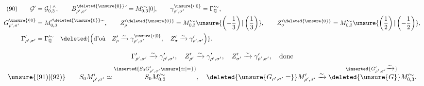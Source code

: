 \[
\begin{aligned}
 (90)\qquad
 \mathcal G'&=\mathcal G_{0,3}^{+\wedge},\qquad
 B_{\rho',\sigma'}^{\deleted{\unsure{0}}\,\prime}
 =M_{0,3}^{\prime\sim}[0],\qquad
 \gamma_{\rho',\sigma'}^{\unsure{\prime|0}}
 =\Gamma_{\mathbb Q}^{\prime\sim},\\
 G_{\rho',\sigma'}^{\unsure{\prime|0}}
 &=M_{0,3}^{\prime\deleted{\unsure{0}}\sim},\qquad
 Z_{\rho}^{\prime\deleted{\unsure{0}}}
 =M_{0,3}^{\prime\sim}\unsure{\left(-\frac13\right)|\left(\frac13\right)},\qquad
 Z_{\sigma}^{\prime\deleted{\unsure{0}}}
 =M_{0,3}^{\prime\sim}\unsure{\left(\frac12\right)|\left(-\frac12\right)},\\
 \Gamma_{\rho',\sigma'}^{\prime}&=\Gamma_{\mathbb Q}^{\prime\sim}
 \quad\deleted{\left(\text{d'où}\quad
 Z_{\rho}^{\prime}\xrightarrow{\sim}\gamma_{\rho',\sigma'}^{\unsure{\prime|0}},\quad
 Z_{\sigma}^{\prime}\xrightarrow{\sim}\gamma_{\rho',\sigma'}^{\prime}\right)}.
\end{aligned}
\]


\[
\begin{gathered}
\Gamma_{\rho',\sigma'}^{\prime}\xrightarrow{\sim}\gamma_{\rho',\sigma'}^{\prime},\quad
Z_{\rho'}^{\prime}\xrightarrow{\sim}\gamma_{\rho',\sigma'}^{\prime},\quad
Z_{\sigma'}^{\prime}\xrightarrow{\sim}\gamma_{\rho',\sigma'}^{\prime},\quad\text{donc}\\
\unsure{(91)|(92)}\qquad
S_0M_{\rho',\sigma'}^{\prime}\simeq
\overset{\inserted{S_0G_{\rho',\sigma'}^{\prime}\unsure{\simeq|=}}}{S_0M_{0,3}^{\prime\sim}},\quad
\deleted{\unsure{G_{\rho',\sigma'}=}}M_{\rho',\sigma'}^{\prime}\xrightarrow{\sim}
\overset{\inserted{G_{\rho',\sigma'}^{\prime}\xrightarrow{\sim}}}{\deleted{\unsure{G}}M_{0,3}^{\prime\sim}}.
\end{gathered}
\]

